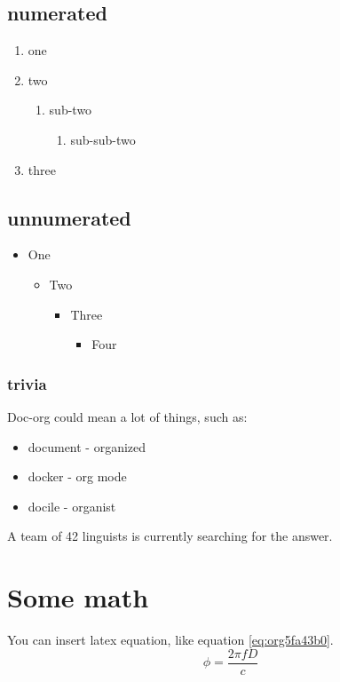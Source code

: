 \subsection{numerated}
\label{sec:org41c9c37}
\begin{enumerate}
\item one
\item two
\begin{enumerate}
\item sub-two
\begin{enumerate}
\item sub-sub-two
\end{enumerate}
\end{enumerate}
\item three
\end{enumerate}

\subsection{unnumerated}
\label{sec:org463f6fd}
\begin{itemize}
\item One
\begin{itemize}
\item Two
\begin{itemize}
\item Three
\begin{itemize}
\item Four
\end{itemize}
\end{itemize}
\end{itemize}
\end{itemize}

\subsubsection{trivia}
\label{sec:org22c0c77}
Doc-org could mean a lot of things, such as:
\begin{itemize}
\item document - organized
\item docker - org mode
\item docile - organist
\end{itemize}
A team of 42 linguists is currently searching for the answer.

\section{Some math}
\label{sec:orgd226a63}
You can insert latex equation, like equation \ref{eq:org5fa43b0}.
\begin{equation}
\label{eq:org5fa43b0}
\phi = \frac{2\pi fD}{c}
\end{equation}


